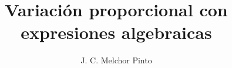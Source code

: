 \documentclass[12pt]{guia}
\title{Variación proporcional con expresiones algebraicas}
\author{J. C. Melchor Pinto}
\begin{document}
\pagestyle{headandfoot}
\addpoints
\INFO
\printanswers

\begin{questions}
    \questionboxed[50]     
    \questionboxed[50]     
\end{questions}
\end{document}
